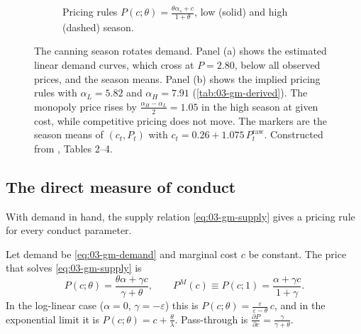 \begin{figure}[htbp]
\begin{subfigure}[t]{0.48\textwidth}
\caption{Pricing rules $P(c;\theta) = \frac{\theta\alpha_s + c}{1 + \theta}$, low (solid) and high (dashed)
season.}
\end{subfigure}
\caption{The canning season rotates demand. Panel (a) shows the estimated linear demand curves, which cross at
$P = 2.80$, below all observed prices, and the season means. Panel (b) shows the implied pricing rules with
$\alpha_L = 5.82$ and $\alpha_H = 7.91$ (\cref{tab:03-gm-derived}). The monopoly price rises by
$\frac{\alpha_H - \alpha_L}{2} = 1.05$ in the high season at given cost, while competitive pricing does not
move. The markers are the season means of $(c_t, P_t)$ with $c_t = 0.26 + 1.075\,P^{\mathrm{raw}}_t$.
Constructed from \citet{GenesoveMullin1998}, Tables 2--4.}
\label{fig:03-gm-pricing-rules}
\end{figure}

\subsection{The direct measure of conduct}\label{sec:03-sugar-direct}

With demand in hand, the supply relation \eqref{eq:03-gm-supply} gives a pricing rule for every conduct
parameter.

\begin{proposition}\label{prop:03-gm-pricing}
Let demand be \eqref{eq:03-gm-demand} and marginal cost $c$ be constant. The price that solves
\eqref{eq:03-gm-supply} is
\begin{equation}\label{eq:03-gm-pricing}
P(c;\theta) = \frac{\theta\alpha + \gamma c}{\gamma + \theta},
\qquad
P^M(c) \equiv P(c;1) = \frac{\alpha + \gamma c}{1 + \gamma}.
\end{equation}
In the log-linear case ($\alpha = 0$, $\gamma = -\varepsilon$) this is
$P(c;\theta) = \frac{\varepsilon}{\varepsilon - \theta}\,c$, and in the exponential limit it is
$P(c;\theta) = c + \frac{\theta}{\lambda}$. Pass-through is $\frac{\partial P}{\partial c} =
\frac{\gamma}{\gamma + \theta}$.
\end{proposition}

